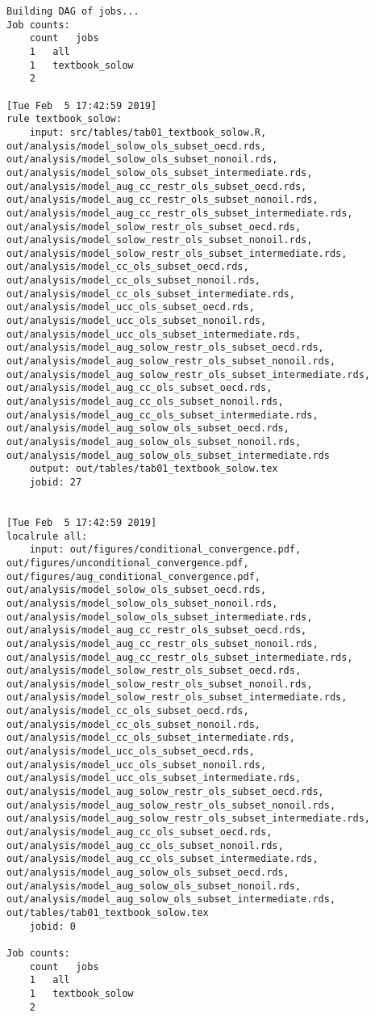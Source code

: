 \documentclass[]{book}
\theoremstyle{definition}
\theoremstyle{definition}
\theoremstyle{definition}
\theoremstyle{remark}
\begin{document}
\begin{verbatim}
Building DAG of jobs...
Job counts:
    count   jobs
    1   all
    1   textbook_solow
    2

[Tue Feb  5 17:42:59 2019]
rule textbook_solow:
    input: src/tables/tab01_textbook_solow.R, out/analysis/model_solow_ols_subset_oecd.rds, out/analysis/model_solow_ols_subset_nonoil.rds, out/analysis/model_solow_ols_subset_intermediate.rds, out/analysis/model_aug_cc_restr_ols_subset_oecd.rds, out/analysis/model_aug_cc_restr_ols_subset_nonoil.rds, out/analysis/model_aug_cc_restr_ols_subset_intermediate.rds, out/analysis/model_solow_restr_ols_subset_oecd.rds, out/analysis/model_solow_restr_ols_subset_nonoil.rds, out/analysis/model_solow_restr_ols_subset_intermediate.rds, out/analysis/model_cc_ols_subset_oecd.rds, out/analysis/model_cc_ols_subset_nonoil.rds, out/analysis/model_cc_ols_subset_intermediate.rds, out/analysis/model_ucc_ols_subset_oecd.rds, out/analysis/model_ucc_ols_subset_nonoil.rds, out/analysis/model_ucc_ols_subset_intermediate.rds, out/analysis/model_aug_solow_restr_ols_subset_oecd.rds, out/analysis/model_aug_solow_restr_ols_subset_nonoil.rds, out/analysis/model_aug_solow_restr_ols_subset_intermediate.rds, out/analysis/model_aug_cc_ols_subset_oecd.rds, out/analysis/model_aug_cc_ols_subset_nonoil.rds, out/analysis/model_aug_cc_ols_subset_intermediate.rds, out/analysis/model_aug_solow_ols_subset_oecd.rds, out/analysis/model_aug_solow_ols_subset_nonoil.rds, out/analysis/model_aug_solow_ols_subset_intermediate.rds
    output: out/tables/tab01_textbook_solow.tex
    jobid: 27


[Tue Feb  5 17:42:59 2019]
localrule all:
    input: out/figures/conditional_convergence.pdf, out/figures/unconditional_convergence.pdf, out/figures/aug_conditional_convergence.pdf, out/analysis/model_solow_ols_subset_oecd.rds, out/analysis/model_solow_ols_subset_nonoil.rds, out/analysis/model_solow_ols_subset_intermediate.rds, out/analysis/model_aug_cc_restr_ols_subset_oecd.rds, out/analysis/model_aug_cc_restr_ols_subset_nonoil.rds, out/analysis/model_aug_cc_restr_ols_subset_intermediate.rds, out/analysis/model_solow_restr_ols_subset_oecd.rds, out/analysis/model_solow_restr_ols_subset_nonoil.rds, out/analysis/model_solow_restr_ols_subset_intermediate.rds, out/analysis/model_cc_ols_subset_oecd.rds, out/analysis/model_cc_ols_subset_nonoil.rds, out/analysis/model_cc_ols_subset_intermediate.rds, out/analysis/model_ucc_ols_subset_oecd.rds, out/analysis/model_ucc_ols_subset_nonoil.rds, out/analysis/model_ucc_ols_subset_intermediate.rds, out/analysis/model_aug_solow_restr_ols_subset_oecd.rds, out/analysis/model_aug_solow_restr_ols_subset_nonoil.rds, out/analysis/model_aug_solow_restr_ols_subset_intermediate.rds, out/analysis/model_aug_cc_ols_subset_oecd.rds, out/analysis/model_aug_cc_ols_subset_nonoil.rds, out/analysis/model_aug_cc_ols_subset_intermediate.rds, out/analysis/model_aug_solow_ols_subset_oecd.rds, out/analysis/model_aug_solow_ols_subset_nonoil.rds, out/analysis/model_aug_solow_ols_subset_intermediate.rds, out/tables/tab01_textbook_solow.tex
    jobid: 0

Job counts:
    count   jobs
    1   all
    1   textbook_solow
    2
\end{verbatim}
\end{document}

